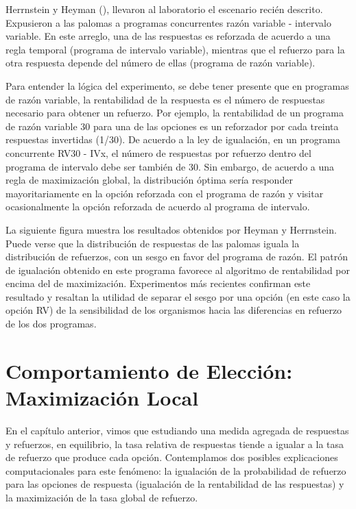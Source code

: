 \documentclass[
  letterpaper,
]{book}
\begin{document}
Herrnstein y Heyman (), llevaron al laboratorio el escenario recién
descrito. Expusieron a las palomas a programas concurrentes razón
variable - intervalo variable. En este arreglo, una de las respuestas es
reforzada de acuerdo a una regla temporal (programa de intervalo
variable), mientras que el refuerzo para la otra respuesta depende del
número de ellas (programa de razón variable).

Para entender la lógica del experimento, se debe tener presente que en
programas de razón variable, la rentabilidad de la respuesta es el
número de respuestas necesario para obtener un refuerzo. Por ejemplo, la
rentabilidad de un programa de razón variable 30 para una de las
opciones es un reforzador por cada treinta respuestas invertidas (1/30).
De acuerdo a la ley de igualación, en un programa concurrente RV30 -
IVx, el número de respuestas por refuerzo dentro del programa de
intervalo debe ser también de 30. Sin embargo, de acuerdo a una regla de
maximización global, la distribución óptima sería responder
mayoritariamente en la opción reforzada con el programa de razón y
visitar ocasionalmente la opción reforzada de acuerdo al programa de
intervalo.

La siguiente figura muestra los resultados obtenidos por Heyman y
Herrnstein. Puede verse que la distribución de respuestas de las palomas
iguala la distribución de refuerzos, con un sesgo en favor del programa
de razón. El patrón de igualación obtenido en este programa favorece al
algoritmo de rentabilidad por encima del de maximización. Experimentos
más recientes confirman este resultado y resaltan la utilidad de separar
el sesgo por una opción (en este caso la opción RV) de la sensibilidad
de los organismos hacia las diferencias en refuerzo de los dos
programas.


\chapter{Comportamiento de Elección: Maximización
Local}\label{comportamiento-de-elecciuxf3n-maximizaciuxf3n-local}

En el capítulo anterior, vimos que estudiando una medida agregada de
respuestas y refuerzos, en equilibrio, la tasa relativa de respuestas
tiende a igualar a la tasa de refuerzo que produce cada opción.
Contemplamos dos posibles explicaciones computacionales para este
fenómeno: la igualación de la probabilidad de refuerzo para las opciones
de respuesta (igualación de la rentabilidad de las respuestas) y la
maximización de la tasa global de refuerzo.
\end{document}
